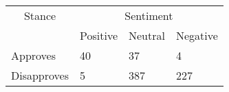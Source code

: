 
\begin{tabular}[t]{llll}
\toprule
\multicolumn{1}{c}{Stance} & \multicolumn{3}{c}{Sentiment} \\
\cmidrule(l{3pt}r{3pt}){1-1} \cmidrule(l{3pt}r{3pt}){2-4}
 & Positive & Neutral & Negative\\
\midrule
Approves & 40 & 37 & 4\\
Disapproves & 5 & 387 & 227\\
\bottomrule
\end{tabular}
